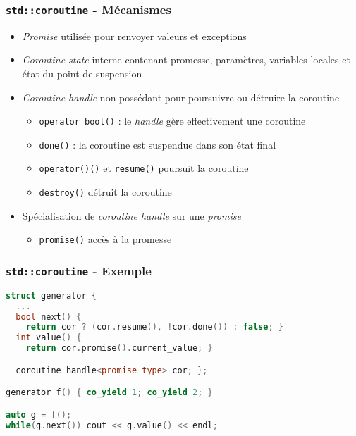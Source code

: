 \documentclass[C++.tex]{subfiles}
\begin{document}
\begin{frame}[fragile]
	\frametitle{\lstinline|std::coroutine| - Mécanismes}
	\begin{itemize}
		\item \textit{Promise} utilisée pour renvoyer valeurs et exceptions
		\item \textit{Coroutine state} interne contenant promesse, paramètres, variables locales et état du point de suspension
		\item \textit{Coroutine handle} non possédant pour poursuivre ou détruire la coroutine
		\begin{itemize}
			\item \lstinline|operator bool()| : le \textit{handle} gère effectivement une coroutine
			\item \lstinline|done()| : la coroutine est suspendue dans son état final


			\item \lstinline|operator()()| et \lstinline|resume()| poursuit la coroutine
			\item \lstinline|destroy()| détruit la coroutine
		\end{itemize}
		\item Spécialisation de \textit{coroutine handle} sur une \textit{promise}
		\begin{itemize}
			\item \lstinline|promise()| accès à la promesse
		\end{itemize}
	\end{itemize}
\end{frame}

\begin{frame}[fragile]
	\frametitle{\lstinline|std::coroutine| - Exemple}
	\begin{lstlisting}[language=C++]
struct generator {
  ...
  bool next() { 
    return cor ? (cor.resume(), !cor.done()) : false; }
  int value() { 
    return cor.promise().current_value; }

  coroutine_handle<promise_type> cor; };

generator f() { co_yield 1; co_yield 2; }

auto g = f();
while(g.next()) cout << g.value() << endl;\end{lstlisting}
\end{frame}
\end{document}
